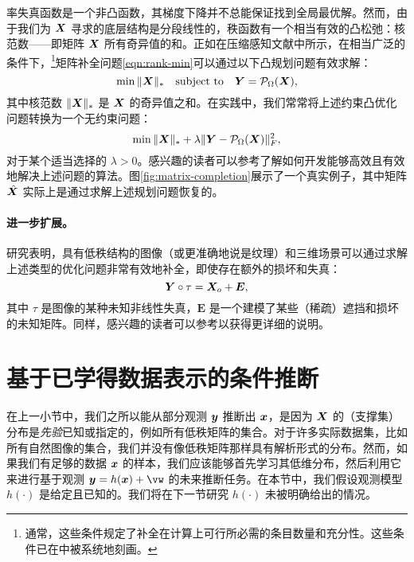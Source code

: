 \documentclass[../../book-main.tex]{subfiles}
\begin{document}
率失真函数是一个非凸函数，其梯度下降并不总能保证找到全局最优解。然而，由于我们为 $\bm{X}$ 寻求的底层结构是分段线性的，秩函数有一个相当有效的凸松弛：核范数——即矩阵 $\bm{X}$ 所有奇异值的和。正如在压缩感知文献中所示，在相当广泛的条件下，\footnote{通常，这些条件规定了补全在计算上可行所必需的条目数量和充分性。这些条件已在\cite{Wright-Ma-2022}中被系统地刻画。}矩阵补全问题\eqref{eqn:rank-min}可以通过以下凸规划问题有效求解：
\begin{equation}
\min \|\bm{X}\|_* \quad \mbox{subject to}
\quad
\bm{Y} = \mathcal{P}_{\Omega}(\bm{X}),
\label{eqn:nuclear-min}
\end{equation}
其中核范数 $\|\bm{X}\|_*$ 是 $\bm{X}$ 的奇异值之和。在实践中，我们常常将上述约束凸优化问题转换为一个无约束问题：
\begin{equation}
\min \|\bm{X}\|_*  + \lambda \|
\bm{Y} - \mathcal{P}_{\Omega}(\bm{X})\|_F^2,
\label{eqn:nuclear-min-lagrangian}
\end{equation}
对于某个适当选择的 $\lambda > 0$。感兴趣的读者可以参考\cite{Wright-Ma-2022}了解如何开发能够高效且有效地解决上述问题的算法。图\ref{fig:matrix-completion}展示了一个真实例子，其中矩阵 $\hat {\bm{X}}$ 实际上是通过求解上述规划问题恢复的。

\paragraph{进一步扩展。}
研究表明，具有低秩结构的图像（或更准确地说是纹理）和三维场景可以通过求解上述类型的优化问题非常有效地补全，即使存在额外的损坏和失真\cite{Zhang2010TILTTI,Liang-ECCV2012,Yi_2023_ICCV}：
\begin{equation}
    \bm{Y} \circ \tau = \bm{X}_o + \boldsymbol{E},
\end{equation}
其中 $\tau$ 是图像的某种未知非线性失真，$\boldsymbol{E}$ 是一个建模了某些（稀疏）遮挡和损坏的未知矩阵。同样，感兴趣的读者可以参考\cite{Wright-Ma-2022}以获得更详细的说明。

\section{基于已学得数据表示的条件推断}
在上一小节中，我们之所以能从部分观测 $\bm{y}$ 推断出 $\bm{x}$，是因为 $\bm{X}$ 的（支撑集）分布是{\em 先验}已知或指定的，例如所有低秩矩阵的集合。对于许多实际数据集，比如所有自然图像的集合，我们并没有像低秩矩阵那样具有解析形式的分布。然而，如果我们有足够的数据 $\bm{x}$ 的样本，我们应该能够首先学习其低维分布，然后利用它来进行基于观测 $\y = h(\x) + \vw$ 的未来推断任务。在本节中，我们假设观测模型 $h(\cdot)$ 是给定且已知的。我们将在下一节研究 $h(\cdot)$ 未被明确给出的情况。
\end{document}

